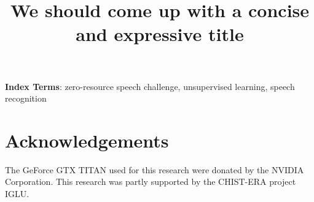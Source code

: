 \documentclass[a4paper]{article}
\title{We should come up with a concise and expressive title}
\begin{document}
\maketitle
% 
\begin{abstract}

\end{abstract}
\noindent\textbf{Index Terms}: zero-resource speech challenge, unsupervised learning, speech recognition







\section{Acknowledgements}
The GeForce GTX TITAN used for this research were donated by the NVIDIA Corporation. This research was partly supported by the CHIST-ERA project IGLU.

\clearpage


\printbibliography[heading=bibnumbered]
%

%
\end{document}
